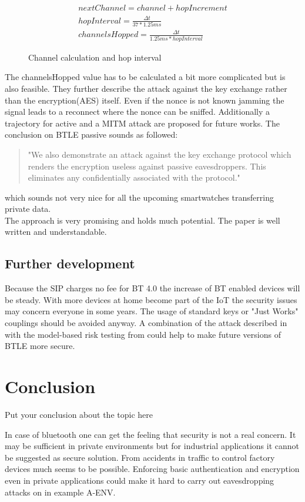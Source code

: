 \documentclass[12pt,a4paper]{article}
\begin{document}
\begin{figure}[h]
\begin{center}
	\begin{align*}
		nextChannel = channel + hopIncrement\\
 		hopInterval = \frac{\Delta t}{37 * 1.25ms} \\
 		channelsHopped = \frac{\Delta t}{1.25ms * hopInterval}
	\end{align*}
\caption{Channel calculation and hop interval \cite{DBLP:conf/woot/Ryan13}}
\label{le_bt_formulas}
\end{center}
\end{figure}
 The channelsHopped value has to be calculated a bit more complicated but is also feasible. They further describe the attack against the key exchange rather than the encryption(AES) itself. Even if the nonce is not known jamming the signal leads to a reconnect where the nonce can be sniffed. Additionally a trajectory for active and a MITM attack are proposed for future works.
The conclusion on BTLE passive sounds as followed:
\begin{quote}
	"We also demonstrate an attack against the key exchange protocol which renders the encryption useless against passive eavesdroppers. This eliminates any confidentially associated with the protocol."\cite{DBLP:conf/woot/Ryan13}
\end{quote}
which sounds not very nice for all the upcoming smartwatches transferring private data.\\
The approach is very promising and holds much potential. The paper is well written and understandable.

\subsection{Further development}
Because the SIP charges no fee for BT 4.0 the increase of BT enabled devices will be steady. With more devices at home become part of the IoT the security issues may concern everyone in some years. The usage of standard keys or "Just Works" couplings should be avoided anyway. A combination of the attack described in \cite{DBLP:conf/woot/Ryan13} with the model-based risk testing from \cite{DBLP:conf/automotiveSS/JakobKSGMSF12} could help to make future versions of BTLE more secure.

\section{Conclusion}
Put your conclusion about the topic here

In case of bluetooth one can get the feeling that security is not a real concern. It may be sufficient in private environments but for industrial applications it cannot be suggested as secure solution. From accidents in traffic to control factory devices much seems to be possible. Enforcing basic authentication and encryption even in private applications could make it hard to carry out eavesdropping attacks on in example A-ENV.

{}

\end{document}
